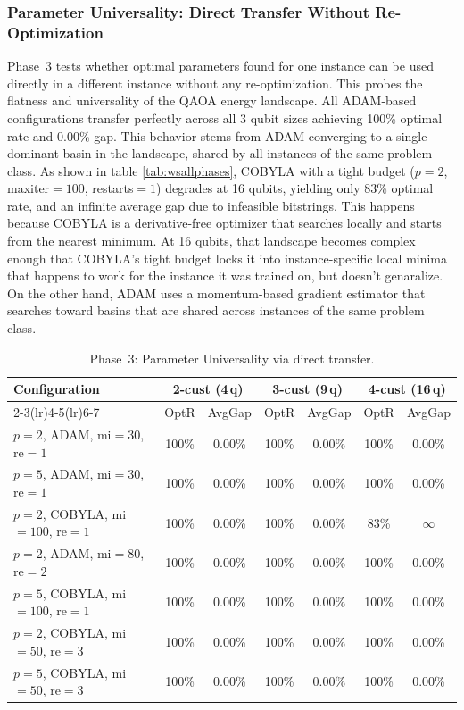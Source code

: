 \documentclass[a4paper]{report}
\begin{document}
{\begin{itemize}
\begin{itemize}
\subsubsection{Parameter Universality: Direct Transfer Without Re-Optimization}

Phase~3 tests whether optimal parameters found for one instance can be used directly in a different instance without any re-optimization. This probes the flatness and universality of the QAOA energy landscape. All ADAM-based configurations transfer perfectly across
all 3 qubit sizes achieving 100\% optimal rate and 0.00\% gap. This behavior stems from ADAM converging to a single dominant basin in the landscape, shared by all
instances of the same problem class. As shown in table \ref{tab:wsallphases}, COBYLA with a tight budget ($p{=}2$, maxiter$=100$, restarts$=1$) degrades at 16 qubits, yielding only 83\% optimal rate, and an infinite average gap due to infeasible bitstrings. This happens because COBYLA is a derivative-free optimizer that searches locally and starts from the nearest minimum. At 16 qubits, that landscape becomes complex enough that COBYLA's tight budget locks it into instance-specific local minima that happens to work for the instance it was trained on, but doesn't genaralize. On the other hand, ADAM uses a momentum-based gradient estimator that searches toward basins that are shared across instances of the same problem class.

\begin{table}[ht]
\centering
\setlength{\tabcolsep}{5pt}
\begin{tabular}{lcc|cc|cc}
\toprule
\multirow{2}{*}{\textbf{Configuration}}
  & \multicolumn{2}{c|}{\textbf{2-cust (4\,q)}}
  & \multicolumn{2}{c|}{\textbf{3-cust (9\,q)}}
  & \multicolumn{2}{c}{\textbf{4-cust (16\,q)}} \\
\cmidrule(lr){2-3}\cmidrule(lr){4-5}\cmidrule(lr){6-7}
  & OptR & AvgGap & OptR & AvgGap & OptR & AvgGap \\
\midrule
$p{=}2$, ADAM,   mi$=30$,  re$=1$ & 100\% & 0.00\% & 100\% & 0.00\% & 100\% & 0.00\% \\
$p{=}5$, ADAM,   mi$=30$,  re$=1$ & 100\% & 0.00\% & 100\% & 0.00\% & 100\% & 0.00\% \\
$p{=}2$, COBYLA, mi$=100$, re$=1$ & 100\% & 0.00\% & 100\% & 0.00\% &  83\% & $\infty$ \\
$p{=}2$, ADAM,   mi$=80$,  re$=2$ & 100\% & 0.00\% & 100\% & 0.00\% & 100\% & 0.00\% \\
$p{=}5$, COBYLA, mi$=100$, re$=1$ & 100\% & 0.00\% & 100\% & 0.00\% & 100\% & 0.00\% \\
$p{=}2$, COBYLA, mi$=50$,  re$=3$ & 100\% & 0.00\% & 100\% & 0.00\% & 100\% & 0.00\% \\
$p{=}5$, COBYLA, mi$=50$,  re$=3$ & 100\% & 0.00\% & 100\% & 0.00\% & 100\% & 0.00\% \\
\bottomrule
\end{tabular}
\caption{Phase~3: Parameter Universality via direct transfer.}
\label{tab:wsphase3}
\end{table}


\end{itemize}
\end{itemize}}
\end{document}
